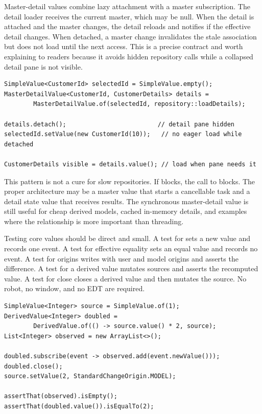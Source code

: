 Master-detail values combine lazy attachment with a master subscription. The
detail loader receives the current master, which may be null. When the detail is
attached and the master changes, the detail reloads and notifies if the
effective detail changes. When detached, a master change invalidates the stale
association but does not load until the next access. This is a precise contract
and worth explaining to readers because it avoids hidden repository calls while
a collapsed detail pane is not visible.

\begin{lstlisting}[caption={Master changes reload attached details only.}]
SimpleValue<CustomerId> selectedId = SimpleValue.empty();
MasterDetailValue<CustomerId, CustomerDetails> details =
        MasterDetailValue.of(selectedId, repository::loadDetails);

details.detach();                         // detail pane hidden
selectedId.setValue(new CustomerId(10));   // no eager load while detached

CustomerDetails visible = details.value(); // load when pane needs it
\end{lstlisting}

This pattern is not a cure for slow repositories. If  blocks,
the call to  blocks. The proper architecture may be a
master value that starts a cancellable task and a detail state value that
receives results. The synchronous master-detail value is still useful for cheap
derived models, cached in-memory details, and examples where the relationship is
more important than threading.

Testing core values should be direct and small. A test for 
sets a new value and records one event. A test for effective equality sets an
equal value and records no event. A test for origins writes with user and model
origins and asserts the difference. A test for a derived value mutates sources
and asserts the recomputed value. A test for close closes a derived value and
then mutates the source. No robot, no window, and no EDT are required.

\begin{lstlisting}[caption={Testing close semantics without Swing.}]
SimpleValue<Integer> source = SimpleValue.of(1);
DerivedValue<Integer> doubled =
        DerivedValue.of(() -> source.value() * 2, source);
List<Integer> observed = new ArrayList<>();

doubled.subscribe(event -> observed.add(event.newValue()));
doubled.close();
source.setValue(2, StandardChangeOrigin.MODEL);

assertThat(observed).isEmpty();
assertThat(doubled.value()).isEqualTo(2);
\end{lstlisting}

